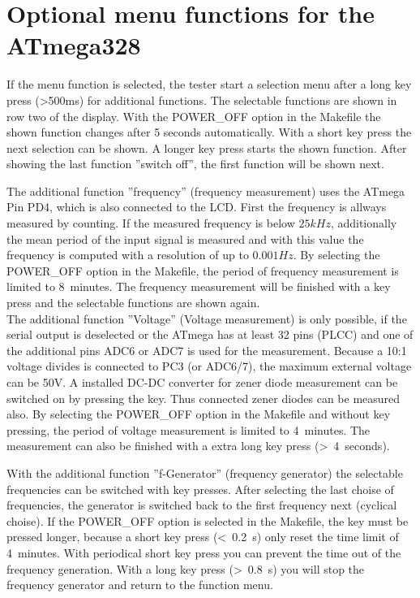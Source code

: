 \section{Optional menu functions for the ATmega328}
If the menu function is selected, the tester start a selection menu after a long key press (\textgreater 500ms)
for additional functions.
The selectable functions are shown in row two of the display.
With the POWER\_OFF option in the Makefile the shown function changes after 5 seconds automatically.
With a short key press the next selection can be shown.
A longer key press starts the shown function.
After showing the last function ''switch off'', the first function will be shown next.

The additional function ''frequency'' (frequency measurement) uses the ATmega Pin PD4, which is also connected to the LCD.
First the frequency is allways measured by counting.
If the measured frequency is below \(25 kHz\), additionally the mean period of the input signal
is measured and with this value the frequency is computed with a resolution of up to \(0.001 Hz\).
By selecting the POWER\_OFF option in the Makefile, the period of frequency measurement is limited to 8~minutes.
The frequency measurement will be finished with a key press and the selectable functions are shown again.\\

The additional function ''Voltage'' (Voltage measurement) is only possible, if the serial output is deselected
or the ATmega has at least 32 pins (PLCC) and one of the additional pins ADC6 or ADC7 is used for the measurement.
Because a 10:1 voltage divides is connected to PC3 (or ADC6/7), the maximum external voltage can be 50V.
A installed DC-DC converter for zener diode measurement can be switched on by pressing the key.
Thus connected zener diodes can be measured also.
By selecting the POWER\_OFF option in the Makefile and without key pressing, the period of voltage measurement is limited to 4~minutes.
The measurement can also be finished with a extra long key press (\textgreater~4~seconds).

With the additional function ''f-Generator'' (frequency generator) the selectable frequencies can be switched with key presses.
After selecting the last choise of frequencies, the generator is switched back to
the first frequency next (cyclical choise).
If the POWER\_OFF option is selected in the Makefile, the key must be pressed longer, because a
short key press (\textless~0.2~s) only reset the time limit of 4~minutes.
With periodical short key press you can prevent the time out of the frequency generation.
With a long key press (\textgreater~0.8~s) you will stop the frequency generator and return to the function menu.\\

